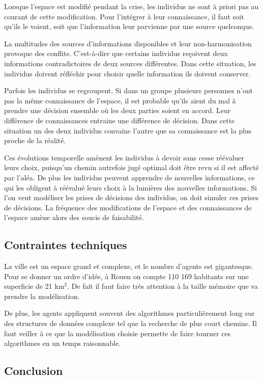 \documentclass[a4paper]{article}
\newcommand{\comment}[1]{}
\begin{document}
Lorsque l'espace est modifié pendant la crise, les individus ne sont à priori
pas au courant de cette modification. Pour l'intégrer à leur connaissance, il
faut soit qu'ils le voient, soit que l'information leur parvienne par une source
quelconque.

La multitudes des sources d'informations disponibles et leur non-harmonisation
provoque des conflits. C'est-à-dire que certains individus reçoivent deux
informations contradictoires de deux sources différentes. Dans cette situation,
les individus doivent réfléchir \comment{réfléchir c'est trop neutre} pour
choisir quelle information ils doivent conserver.

Parfois les individus se regroupent. Si dans un groupe plusieurs personnes n'ont
pas la même connaissance de l'espace, il est probable qu'ils aient du mal à
prendre une décision ensemble où les deux parties soient en accord. Leur
différence de connaissances entraine une différence de décision. Dans cette
situation un des deux individus convainc l'autre que sa connaissance est la plus
proche de la réalité.

Ces évolutions temporelle amènent les individus à devoir sans cesse réévaluer
leurs choix, puisqu'un chemin autrefois jugé optimal doit être revu si il est
affecté par l'aléa. De plus les individus peuvent apprendre de nouvelles
informations, ce qui les obligent à réévalué leurs choix à la lumières des
nouvelles informations. Si l'on veut modéliser les prises de décisions des
individus, on doit simuler ces prises de décisions. La fréquence des
modifications de l'espace et des connaissances de l'espace amène alors des
soucis de faisabilité.

\subsection{Contraintes techniques}

La ville est un espace grand et complexe, et le nombre d'agents est gigantesque.
Pour se donner un ordre d'idée, à Rouen on compte 110 169 habitants sur une
superficie de 21 km$^2$. De fait il faut faire très attention à la taille
mémoire que va prendre la modélisation.

De plus, les agents appliquent souvent des algorithmes particulièrement long sur
des structures de données complexe tel que la recherche de plus court chemins.
Il faut veiller à ce que la modélisation choisie permette de faire tourner ces
algorithmes en un temps raisonnable.

\subsection{Conclusion}
\end{document}
